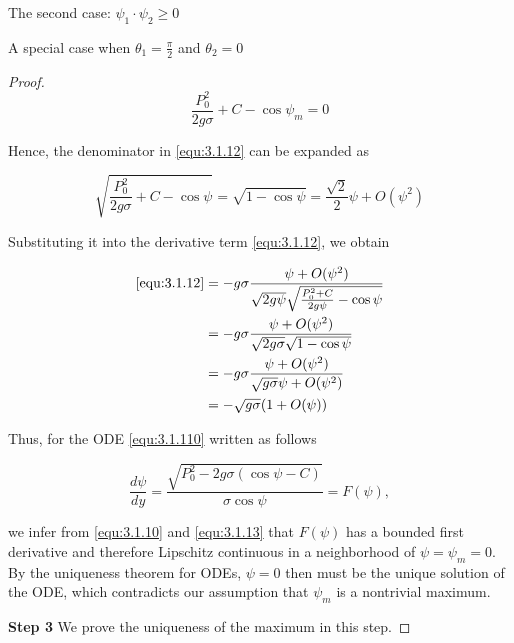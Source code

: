 \documentclass[letterpaper,reqno,10pt,twoside]{amsart}
\theoremstyle{definition}
\theoremstyle{remark}
\begin{document}
\begin{section}{The second case: $\psi_1\cdot \psi_2\geq 0$ }
\begin{subsection}{A special case when $\theta_1=\frac{\pi}{2}$ and $\theta_2=0$}
\begin{proof}
    \begin{equation*}
        \frac{P_{0}^{2}}{2g\sigma}+C-\cos\psi_m=0
    \end{equation*}

    \noindent Hence, the denominator in \eqref{equ:3.1.12} can be expanded as

    \begin{equation*}
        \sqrt{\frac{P_{0}^{2}}{2g\sigma}+C-\cos\psi}=\sqrt{1-\cos\psi}=\frac{\sqrt{2}}{2}\psi+O(\psi^{2})
    \end{equation*}
    
    \noindent  Substituting it into the derivative term \eqref{equ:3.1.12}, we obtain

    \begin{align}
         \eqref{equ:3.1.12}&=-g\sigma \frac{\psi+O(\psi^{2})}{\sqrt{2g\psi}\sqrt{\frac{P_{0}^{2}+C}{2g\psi}-\cos\psi}} \notag\\
         &= -g\sigma \frac{\psi+O(\psi^{2})}{\sqrt{2g\sigma}\sqrt{1-\cos\psi}} \notag\\
         &=-g\sigma \frac{\psi+O(\psi^{2})}{\sqrt{g\sigma}\psi+O(\psi^{2})} \notag\\
          &=-\sqrt{g\sigma} (1+O(\psi)) \label{equ:3.1.13}
    \end{align}
    
      Thus, for the ODE \eqref{equ:3.1.110} written as follows

    \begin{equation*}
        \frac{d\psi}{dy}=\frac{\sqrt{P_{0}^{2}-2g\sigma(\cos\psi-C)}}{\sigma \cos\psi}=F(\psi),
    \end{equation*}

    \noindent we infer from \eqref{equ:3.1.10} and \eqref{equ:3.1.13} that $F(\psi)$ has a bounded first derivative and therefore Lipschitz continuous in a neighborhood of $\psi=\psi_m=0$. By the uniqueness theorem for ODEs,  $\psi=0$ then must be the unique solution of the ODE, which contradicts our assumption that $\psi_{m}$ is a nontrivial maximum.

    \textbf{Step 3} We prove the uniqueness of the maximum in this step. 
    

\end{proof}
\end{subsection}
\end{section}
\end{document}
